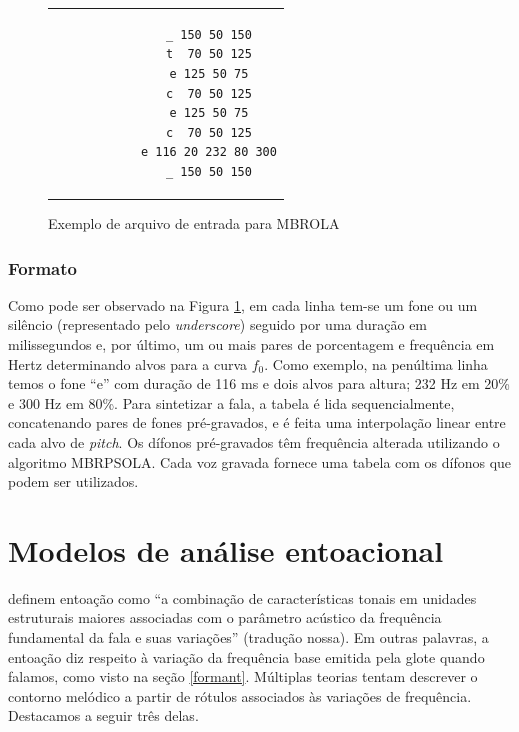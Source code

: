 \begin{figure}[thp] %
    \centering          %
    \begin{tabular}{c}  %
        \begin{lstlisting}
            _ 150 50 150
            t  70 50 125
            e 125 50 75
            c  70 50 125
            e 125 50 75
            c  70 50 125
            e 116 20 232 80 300
            _ 150 50 150
        \end{lstlisting}
    \end{tabular}
    \caption{Exemplo de arquivo de entrada para MBROLA \label{mbr}}
\end{figure}

\subsubsection{Formato}
Como pode ser observado na Figura \ref{mbr}, em cada linha tem-se um fone ou um
silêncio (representado pelo \emph{underscore}) seguido por uma duração em
milissegundos e, por último, um ou mais pares de porcentagem e frequência em
Hertz determinando alvos para a curva $ f_0 $. Como exemplo, na penúltima linha temos
o fone ``e'' com duração de 116 ms e dois alvos para altura; 232 Hz em 20\% e
300 Hz em 80\%. Para sintetizar a fala, a tabela é lida sequencialmente,
concatenando pares de fones pré-gravados, e é feita uma interpolação linear
entre cada alvo de \emph{pitch}. Os dífonos pré-gravados têm frequência alterada
utilizando o algoritmo MBRPSOLA. Cada voz gravada fornece uma tabela com os dífonos que podem ser utilizados. 

\section{Modelos de análise entoacional}
\label{entoa}

 definem entoação como ``a combinação de características
tonais em unidades estruturais maiores associadas com o parâmetro acústico da
frequência fundamental da fala e suas variações'' (tradução nossa). Em outras
palavras, a entoação diz respeito à variação da frequência base emitida pela
glote quando falamos, como visto na seção \ref{formant}. Múltiplas teorias
tentam descrever o contorno melódico a partir de rótulos associados às variações
de frequência. Destacamos a seguir três delas.

